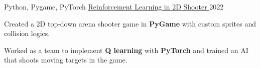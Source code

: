 \begin{cventries}
  \cventry
    {Python, Pygame, PyTorch} %
    {\href{https://github.com/shiqui/TSDP-Reinforcement-Learning-in-Video-Games}{Reinforcement Learning in 2D Shooter {\faLink}}} %
    {} %
    {2022} %
    {
      \begin{cvitems} %
        \item {Created a 2D top-down arena shooter game in \textbf{PyGame} with custom sprites and collision logics.}
        \item {Worked as a team to implement \textbf{Q learning} with \textbf{PyTorch} and trained an AI that shoots moving targets in the game.}
      \end{cvitems}
    }



\end{cventries}
